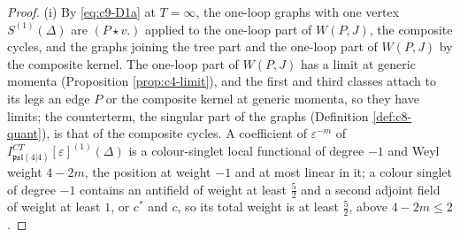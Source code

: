 \begin{proof}
(i) By \eqref{eq:c9-D1a} at $T=\infty$, the one-loop graphs with one vertex $S^{(1)}(\Delta)$ are $(P\star v.)$ applied to the one-loop part of $W(P,J)$, the composite cycles, and the graphs joining the tree part and the one-loop part of $W(P,J)$ by the composite kernel. The one-loop part of $W(P,J)$ has a limit at generic momenta (Proposition \ref{prop:c4-limit}), and the first and third classes attach to its legs an edge $P$ or the composite kernel at generic momenta, so they have limits; the counterterm, the singular part of the graphs (Definition \ref{def:c8-quant}), is that of the composite cycles. A coefficient of $\varepsilon^{-m}$ of $I^{CT}_{\mathfrak{psl}(4|4)}[\varepsilon]^{(1)}(\Delta)$ is a colour-singlet local functional of degree $-1$ and Weyl weight $4-2m$, the position at weight $-1$ and at most linear in it; a colour singlet of degree $-1$ contains an antifield of weight at least $\tfrac52$ and a second adjoint field of weight at least $1$, or $c^*$ and $c$, so its total weight is at least $\tfrac52$, above $4-2m\le2$.


\end{proof}
